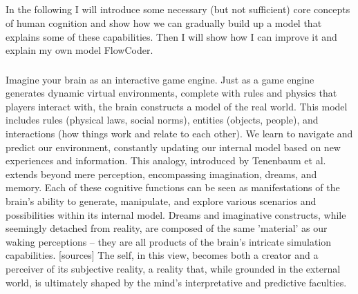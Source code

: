 \subsection{}
In the following I will introduce some necessary (but not sufficient) core concepts of human cognition and show how we can gradually build up a model that explains some of these capabilities. Then I will show how I can improve it and explain my own model FlowCoder.

\subsubsection{}

Imagine your brain as an interactive game engine. Just as a game engine generates dynamic virtual environments, complete with rules and physics that players interact with, the brain constructs a model of the real world. This model includes rules (physical laws, social norms), entities (objects, people), and interactions (how things work and relate to each other). We learn to navigate and predict our environment, constantly updating our internal model based on new experiences and information.
This analogy, introduced by Tenenbaum et al. \cite{Ullman_Spelke_Battaglia_Tenenbaum_2017, Lake_Ullman_Tenenbaum_Gershman_2017, rule_child_2020} extends beyond mere perception, encompassing imagination, dreams, and memory. Each of these cognitive functions can be seen as manifestations of the brain's ability to generate, manipulate, and explore various scenarios and possibilities within its internal model. Dreams and imaginative constructs, while seemingly detached from reality, are composed of the same 'material' as our waking perceptions – they are all products of the brain's intricate simulation capabilities. [sources]
The self, in this view, becomes both a creator and a perceiver of its subjective reality, a reality that, while grounded in the external world, is ultimately shaped by the mind's interpretative and predictive faculties.

